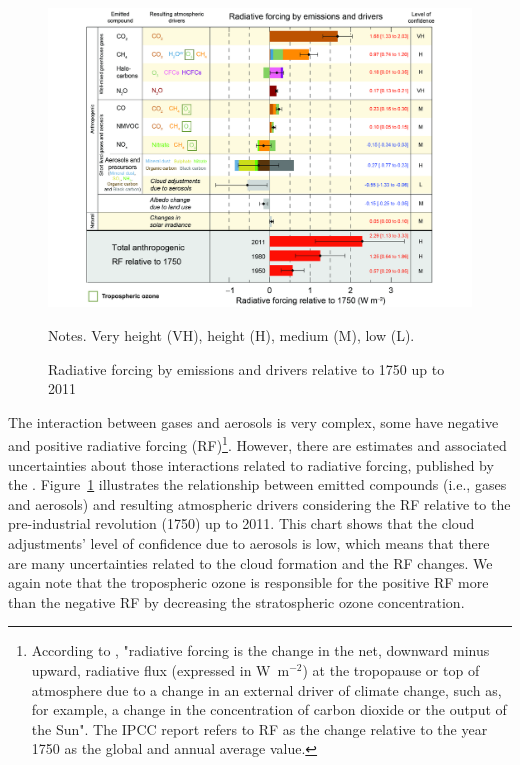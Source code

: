 \begin{figure}[htbp]
  \centering
  \includegraphics[width=13cm]{fig/FigSPM-05.pdf}
  \caption{Radiative forcing by emissions and drivers relative to 1750 up to 2011  \citep[ilustration adapted from][]{IPCC2013} }
  {\scriptsize Notes. Very height (VH), height (H), medium (M), low (L).}
  \label{fig:rf_emi}
\end{figure}

The interaction between gases and aerosols is very complex, some have negative and positive radiative forcing (RF)\footnote{According to \citet{IPCC2013},
"radiative forcing is the change in the net, downward minus upward, radiative flux (expressed in W~m$^{-2}$) at the tropopause or top of atmosphere due to a change in an external driver of climate change, such as, for example, a change in the concentration of carbon dioxide or the output of the Sun".
The IPCC report refers to RF as the change relative to the year 1750 as the global and annual average value.}.
However, there are estimates and associated uncertainties about those interactions related to radiative forcing, published by the \citet{IPCC2013}.
Figure~\ref{fig:rf_emi} illustrates the relationship between emitted compounds (i.e., gases and aerosols) and resulting atmospheric drivers considering the RF relative to the pre-industrial revolution (1750) up to 2011.
This chart shows that the cloud adjustments' level of confidence due to aerosols is low, which means that there are many uncertainties related to the cloud formation and the RF changes.
We again note that the tropospheric ozone is responsible for the positive RF more than the negative RF by decreasing the stratospheric ozone concentration. 

